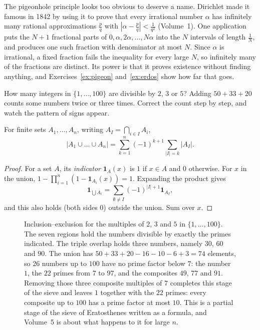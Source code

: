 The pigeonhole principle looks too obvious to deserve a name. Dirichlet made it famous in 1842 by using it to prove that every irrational number $\alpha$ has infinitely many rational approximations $\frac pq$ with $\left|\alpha-\frac pq\right|<\frac1{q^2}$ (Volume~1). One application puts the $N+1$ fractional parts of $0,\alpha,2\alpha,\dots,N\alpha$ into the $N$ intervals of length $\frac1N$, and produces one such fraction with denominator at most $N$. Since $\alpha$ is irrational, a fixed fraction fails the inequality for every large $N$, so infinitely many of the fractions are distinct. Its power is that it proves existence without finding anything, and Exercises~\ref{ex:pigeon} and~\ref{ex:erdos} show how far that goes.

\begin{think}
How many integers in $\{1,\dots,100\}$ are divisible by $2$, $3$ or $5$? Adding $50+33+20$ counts some numbers twice or three times. Correct the count step by step, and watch the pattern of signs appear.
\end{think}

\begin{theorem}\label{thm:incexc}
For finite sets $A_1,\dots,A_n$, writing $A_I=\bigcap_{i\in I}A_i$,
\[
\left|A_1\cup\dots\cup A_n\right|=\sum_{k=1}^n(-1)^{k+1}\sum_{|I|=k}|A_I|.
\]
\end{theorem}
\begin{proof}
For a set $A$, its \emph{indicator} $\mathbf 1_A(x)$ is $1$ if $x\in A$ and $0$ otherwise. For $x$ in the union, $1-\prod_{i=1}^n\left(1-\mathbf 1_{A_i}(x)\right)=1$. Expanding the product gives
\[\mathbf 1_{\bigcup A_i}=\sum_{\emptyset\ne I}(-1)^{|I|+1}\mathbf 1_{A_I},\]
and this also holds (both sides $0$) outside the union. Sum over $x$.
\end{proof}

\begin{figure}[ht]
\centering
{}
\caption{Inclusion--exclusion for the multiples of $2$, $3$ and $5$ in $\{1,\dots,100\}$. The seven regions hold the numbers divisible by exactly the primes indicated. The triple overlap holds three numbers, namely $30$, $60$ and $90$. The union has $50+33+20-16-10-6+3=74$ elements, so $26$ numbers up to $100$ have no prime factor below $7$: the number $1$, the $22$ primes from $7$ to $97$, and the composites $49$, $77$ and $91$. Removing those three composite multiples of $7$ completes this stage of the sieve and leaves $1$ together with the $22$ primes: every composite up to $100$ has a prime factor at most $10$. This is a partial stage of the sieve of Eratosthenes written as a formula, and Volume~5 is about what happens to it for large $n$.}
\label{fig:venn}
\end{figure}

